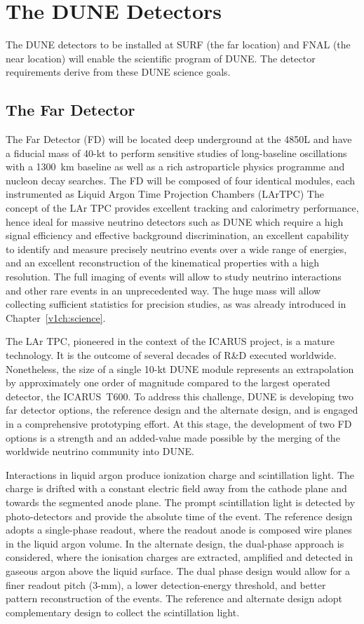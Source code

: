 \section{The DUNE Detectors}

The DUNE detectors to be installed at SURF (the far location) and FNAL (the near location) will enable the scientific program of DUNE.  The detector 
requirements derive from these DUNE science goals.

\subsection{The Far Detector}
The  Far Detector (FD) will be located deep underground at the 4850L and have
a  fiducial mass of 40-kt to perform sensitive studies of long-baseline oscillations with a 1300~km baseline as well as a rich astroparticle physics programme and nucleon decay searches. The FD  will be composed of four identical modules, each instrumented as Liquid Argon Time Projection Chambers (LArTPC)
The concept of the LAr TPC provides
excellent tracking and calorimetry performance, hence ideal for massive neutrino detectors such as DUNE which require a high signal efficiency and effective background discrimination,  an excellent capability to identify and measure precisely neutrino events over a wide range of energies, and an excellent reconstruction of the kinematical properties
with a high resolution. The full imaging of events will allow to study neutrino interactions and
other rare events in an unprecedented way. The huge mass will allow collecting sufficient statistics for precision
studies, as was already introduced in Chapter~\ref{v1ch:science}.

The LAr TPC, pioneered in the context of the ICARUS project, is a mature technology. It is the outcome
of several decades of R\&D executed worldwide.  Nonetheless, the size of a single 10-kt DUNE module represents an extrapolation by approximately one order of magnitude compared to the largest operated detector, the ICARUS~T600. To address this challenge, DUNE is developing two far detector options, the reference design and the alternate design, and is engaged in a 
comprehensive prototyping effort. At this stage, the development of two FD options is a strength and an added-value 
made possible by the merging of the worldwide neutrino community into DUNE.

Interactions in liquid argon produce ionization charge and scintillation light.
The charge is drifted with a constant electric field away from the cathode
plane and towards the segmented anode plane. 
The prompt scintillation light
is detected by photo-detectors and provide the absolute time of the event.
The reference design adopts a single-phase readout, where the readout anode is composed wire planes in the liquid argon volume. 
In the alternate design, the  dual-phase approach is considered, where the 
ionisation charges are extracted, amplified and detected in gaseous argon above the liquid surface. 
The dual phase design would allow for a finer readout pitch (3-mm), 
a lower detection-energy threshold, and better pattern reconstruction of the events.
The reference and alternate design adopt complementary design 
to collect the scintillation light.


